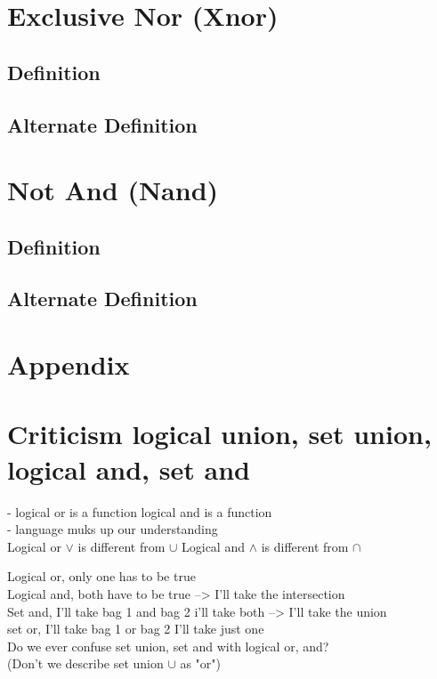 \documentclass[11pt]{article}
\begin{document}
\section{Exclusive Nor (Xnor)}
\subsection{Definition}
\subsection{Alternate Definition}




\section{Not And (Nand)}
\subsection{Definition}
\subsection{Alternate Definition}



\newpage
\section*{Appendix}
\section{Criticism logical union, set union, logical and, set and}
- logical or is a function logical and is a function\\
- language muks up our understanding\\

Logical or $\lor$ is different from $\cup$
Logical and $\land$ is different from $\cap$

Logical or, only one has to be true\\
Logical and, both have to be true --> I'll take the intersection\\

Set and, I'll take bag 1 and bag 2 i'll take both --> I'll take the union\\
set or, I'll take bag 1 or bag 2 I'll take just one\\

Do we ever confuse set union, set and with logical or, and?\\
(Don't we describe set union $\cup$ as "or")
\end{document}
